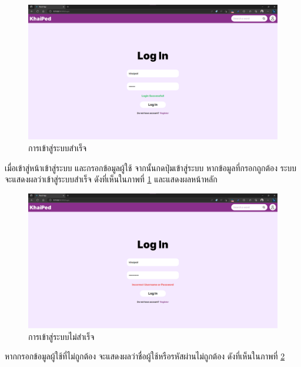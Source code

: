 \documentclass[12pt,oneside,openright,a4paper]{cpe-thai-project}
\begin{document}
\pagebreak
\begin{figure}[!h]\centering
	\includegraphics[width=\textwidth, keepaspectratio=true]{image/chap4/UI/login success.png}
	\caption{{การเข้าสู่ระบบสำเร็จ}}\label{fig:chap4UILogInSuccess}
\end{figure}
\hspace{1cm}
เมื่อเข้าสู่หน้าเข้าสู่ระบบ และกรอกข้อมูลผู้ใช้ จากนั้นกดปุ่มเข้าสู่ระบบ หากข้อมูลที่กรอกถูกต้อง ระบบจะแสดงผลว่าเข้าสู่ระบบสำเร็จ 
ดังที่เห็นในภาพที่ \ref{fig:chap4UILogInSuccess} และแสดงผลหน้าหลัก

\begin{figure}[!h]\centering
	\includegraphics[width=\textwidth, keepaspectratio=true]{image/chap4/UI/login failed.png}
	\caption{{การเข้าสู่ระบบไม่สำเร็จ}}\label{fig:chap4UILogInFailed}
\end{figure}
\hspace{1cm}
หากกรอกข้อมูลผู้ใช้ที่ไม่ถูกต้อง จะแสดงผลว่าชื่อผู้ใช้หรือรหัสผ่านไม่ถูกต้อง ดังที่เห็นในภาพที่ \ref{fig:chap4UILogInFailed}
\end{document}
